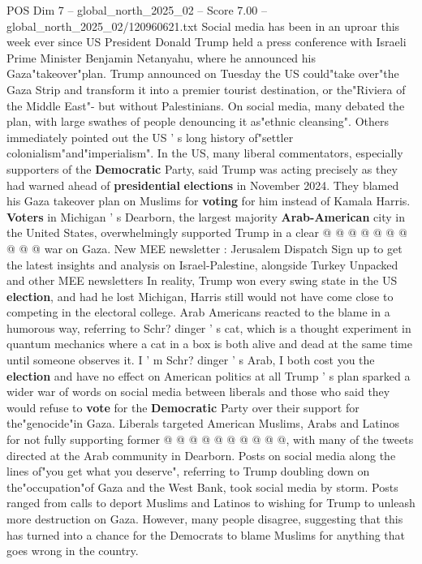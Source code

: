 \begin{textsample}{POS Dim 7 – global\_north\_2025\_02 – Score 7.00 – global\_north\_2025\_02/120960621.txt}  \label{ex:f7_pos_280}
Social media has been in an uproar this week ever since US President Donald Trump held a press conference with Israeli Prime Minister Benjamin Netanyahu, where he announced his Gaza"takeover"plan.
Trump announced on Tuesday the US could"take over"the Gaza Strip and transform it into a premier tourist destination, or the"Riviera of the Middle East"- but without Palestinians.
On social media, many debated the plan, with large swathes of people denouncing it as"ethnic cleansing".
Others immediately pointed out the US ' s long history of"settler colonialism"and"imperialism".
In the US, many liberal commentators, especially supporters of the \textbf{Democratic} Party, said Trump was acting precisely as they had warned ahead of \textbf{presidential} \textbf{elections} in November 2024.
They blamed his Gaza takeover plan on Muslims for \textbf{voting} for him instead of Kamala Harris. \textbf{Voters} in Michigan ' s Dearborn, the largest majority \textbf{Arab-American} city in the United States, overwhelmingly supported Trump in a clear @ @ @ @ @ @ @ @ @ @ war on Gaza.
New MEE newsletter : Jerusalem Dispatch Sign up to get the latest insights and analysis on Israel-Palestine, alongside Turkey Unpacked and other MEE newsletters In reality, Trump won every swing state in the US \textbf{election}, and had he lost Michigan, Harris still would not have come close to competing in the electoral college.
Arab Americans reacted to the blame in a humorous way, referring to Schr? dinger ' s cat, which is a thought experiment in quantum mechanics where a cat in a box is both alive and dead at the same time until someone observes it.
I ' m Schr? dinger ' s Arab, I both cost you the \textbf{election} and have no effect on American politics at all Trump ' s plan sparked a wider war of words on social media between liberals and those who said they would refuse to \textbf{vote} for the \textbf{Democratic} Party over their support for the"genocide"in Gaza.
Liberals targeted American Muslims, Arabs and Latinos for not fully supporting former @ @ @ @ @ @ @ @ @ @, with many of the tweets directed at the Arab community in Dearborn.
Posts on social media along the lines of"you get what you deserve", referring to Trump doubling down on the"occupation"of Gaza and the West Bank, took social media by storm.
Posts ranged from calls to deport Muslims and Latinos to wishing for Trump to unleash more destruction on Gaza.
However, many people disagree, suggesting that this has turned into a chance for the Democrats to blame Muslims for anything that goes wrong in the country.

\end{textsample}
